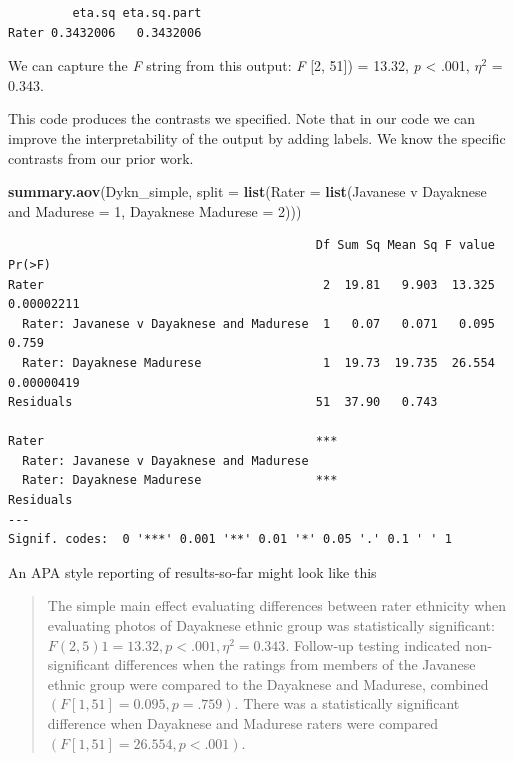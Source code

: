 \documentclass[
  11pt,
]{book}
\newenvironment{Shaded}{\begin{snugshade}}{\end{snugshade}}
\newcommand{\AttributeTok}[1]{\textcolor[rgb]{0.27,0.27,0.27}{#1}}
\newcommand{\DecValTok}[1]{\textcolor[rgb]{0.06,0.06,0.06}{#1}}
\newcommand{\FunctionTok}[1]{\textcolor[rgb]{0.27,0.27,0.27}{\textbf{#1}}}
\newcommand{\NormalTok}[1]{#1}
\newcommand{\OtherTok}[1]{\textcolor[rgb]{0.37,0.37,0.37}{#1}}
\newcommand{\StringTok}[1]{\textcolor[rgb]{0.5,0.5,0.5}{#1}}
\begin{document}
\begin{verbatim}
         eta.sq eta.sq.part
Rater 0.3432006   0.3432006
\end{verbatim}

We can capture the \emph{F} string from this output: \emph{F} {[}2, 51{]}) = 13.32, \emph{p} \textless{} .001, \(\eta ^{2}\) = 0.343.

This code produces the contrasts we specified. Note that in our code we can improve the interpretability of the output by adding labels. We know the specific contrasts from our prior work.

\begin{Shaded}
\begin{Highlighting}[]
\FunctionTok{summary.aov}\NormalTok{(Dykn\_simple, }\AttributeTok{split =} \FunctionTok{list}\NormalTok{(}\AttributeTok{Rater =} \FunctionTok{list}\NormalTok{(}\StringTok{\textasciigrave{}}\AttributeTok{Javanese v Dayaknese and Madurese}\StringTok{\textasciigrave{}} \OtherTok{=} \DecValTok{1}\NormalTok{,}
    \StringTok{\textasciigrave{}}\AttributeTok{Dayaknese Madurese}\StringTok{\textasciigrave{}} \OtherTok{=} \DecValTok{2}\NormalTok{)))}
\end{Highlighting}
\end{Shaded}

\begin{verbatim}
                                           Df Sum Sq Mean Sq F value     Pr(>F)
Rater                                       2  19.81   9.903  13.325 0.00002211
  Rater: Javanese v Dayaknese and Madurese  1   0.07   0.071   0.095      0.759
  Rater: Dayaknese Madurese                 1  19.73  19.735  26.554 0.00000419
Residuals                                  51  37.90   0.743                   
                                              
Rater                                      ***
  Rater: Javanese v Dayaknese and Madurese    
  Rater: Dayaknese Madurese                ***
Residuals                                     
---
Signif. codes:  0 '***' 0.001 '**' 0.01 '*' 0.05 '.' 0.1 ' ' 1
\end{verbatim}

An APA style reporting of results-so-far might look like this

\begin{quote}
The simple main effect evaluating differences between rater ethnicity when evaluating photos of Dayaknese ethnic group was statistically significant: \(F(2, 5)1 = 13.32, p < .001, \eta ^{2} = 0.343\). Follow-up testing indicated non-significant differences when the ratings from members of the Javanese ethnic group were compared to the Dayaknese and Madurese, combined \((F [1, 51] = 0.095, p = .759)\). There was a statistically significant difference when Dayaknese and Madurese raters were compared \((F [1, 51] =26.554, p < .001)\).
\end{quote}
\end{document}
